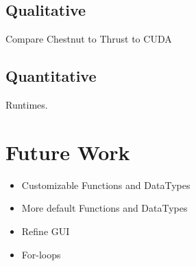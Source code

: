 \documentclass{article}
\renewcommand{\|}{\origbar} %
\begin{document}
\subsection{Qualitative}

Compare Chestnut to Thrust to CUDA

\subsection{Quantitative}

Runtimes.

\section{Future Work}
\label{sec:future}

\begin{itemize}
  \item Customizable Functions and DataTypes
  \item More default Functions and DataTypes
  \item Refine GUI
  \item For-loops
\end{itemize}
\end{document}
